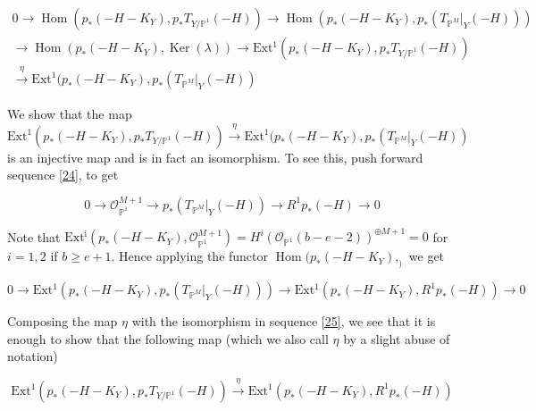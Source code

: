 \documentclass[11pt,twoside]{amsart}
\theoremstyle{plain}
\numberwithin{equation}{section}
\theoremstyle{definition}
\begin{document}
\begin{multline}\label{30}
0 \to \operatorname{Hom}(p_*(-H-K_Y), 
 p_*T_{Y/\mathbb{P}^1}(-H))  \to \operatorname{Hom}(p_*(-H-K_Y), p_*(T_{\mathbb{P}^M}|_Y(-H))) \\ \to \operatorname{Hom}(p_*(-H-K_Y),\operatorname{Ker}(\lambda)) \to \operatorname{Ext^1}(p_*(-H-K_Y), 
 p_*T_{Y/\mathbb{P}^1}(-H)) \\ \xrightarrow[]{\eta} \operatorname{Ext^1}(p_*(-H-K_Y), 
 p_*(T_{\mathbb{P}^M}|_Y(-H))
\end{multline}


We show that the map $\operatorname{Ext^1}(p_*(-H-K_Y), 
 p_*T_{Y/\mathbb{P}^1}(-H))  \xrightarrow[]{\eta} \operatorname{Ext^1}(p_*(-H-K_Y), 
 p_*(T_{\mathbb{P}^M}|_Y(-H))$ is an injective map and is in fact an isomorphism. To see this, push forward sequence \ref{24}, to get 

 \begin{equation}\label{25}
     0 \to \mathcal{O}_{\mathbb{P}^1}^{M+1} \to p_*(T_{\mathbb{P}^M}|_Y(-H)) \to R^1p_*(-H) \to 0
 \end{equation}

Note that $\operatorname{Ext^i}(p_*(-H-K_Y), \mathcal{O}_{\mathbb{P}^1}^{M+1}) = H^i(\mathcal{O}_{\mathbb{P}^1}(b-e-2))^{\oplus M+1} = 0$ for $i = 1,2$ if $b \geq e+1$. Hence applying the functor $\operatorname{Hom}(p_*(-H-K_Y), _)$ we get 

\begin{equation}\label{26}
     0 \to \operatorname{Ext^1}(p_*(-H-K_Y), 
 p_*(T_{\mathbb{P}^M}|_Y(-H))) \to \operatorname{Ext^1}(p_*(-H-K_Y), 
 R^1p_*(-H)) \to 0
 \end{equation}

Composing the map $\eta$ with the isomorphism in sequence \ref{25}, we see that it is enough to show that the following map (which we also call $\eta$ by a slight abuse of notation)

\begin{equation}\label{27}
   \operatorname{Ext^1}(p_*(-H-K_Y), 
 p_*T_{Y/\mathbb{P}^1}(-H))  \xrightarrow[]{\eta} \operatorname{Ext^1}(p_*(-H-K_Y), 
 R^1p_*(-H)) 
\end{equation}
\end{document}
